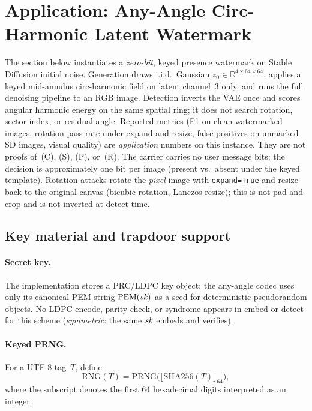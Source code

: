 \section{Application: Any-Angle Circ-Harmonic Latent Watermark}
\label{sec:app-anyangle}

The section below instantiates a \emph{zero-bit}, keyed presence watermark on
Stable Diffusion initial noise.
Generation draws i.i.d.\ Gaussian \(z_0\in\mathbb{R}^{4\times64\times64}\), applies a
keyed mid-annulus circ-harmonic field on latent channel~3 only, and runs the full
denoising pipeline to an RGB image.
Detection inverts the VAE once and scores angular harmonic energy on the same
spatial ring; it does not search rotation, sector index, or residual angle.
Reported metrics (F1 on clean watermarked images, rotation pass rate under
expand-and-resize, false positives on unmarked SD images, visual quality) are
\emph{application} numbers on this instance.
They are not proofs of~(C), (S), (P), or~(R).
The carrier carries no user message bits; the decision is approximately one bit
per image (present vs.\ absent under the keyed template).
Rotation attacks rotate the \emph{pixel} image with \texttt{expand=True} and
resize back to the original canvas (bicubic rotation, Lanczos resize); this is
not pad-and-crop and is not inverted at detect time.

\subsection{Key material and trapdoor support}
\label{sec:anyangle-key}

\paragraph{Secret key.}
The implementation stores a PRC/LDPC key object; the any-angle codec uses only its
canonical PEM string \(\mathrm{PEM}(\mathit{sk})\) as a seed for deterministic pseudorandom
objects.
No LDPC encode, parity check, or syndrome appears in embed or detect for this
scheme (\emph{symmetric}: the same \(\mathit{sk}\) embeds and verifies).

\paragraph{Keyed PRNG.}
For a UTF-8 tag~\(T\), define
\[
\mathrm{RNG}(T)=\mathrm{PRNG}\bigl(\lfloor \mathrm{SHA256}(T)\rfloor_{64}\bigr),
\]
where the subscript denotes the first 64 hexadecimal digits interpreted as an integer.

